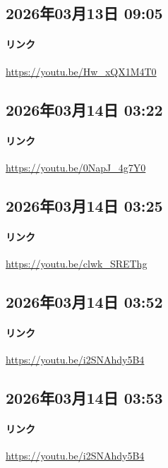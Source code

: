 \subsection*{2026年03月13日 09:05}

\paragraph{リンク}
\url{https://youtu.be/Hw_xQX1M4T0}

\subsection*{2026年03月14日 03:22}

\paragraph{リンク}
\url{https://youtu.be/0NapJ_4g7Y0}

\subsection*{2026年03月14日 03:25}

\paragraph{リンク}
\url{https://youtu.be/clwk_SREThg}

\subsection*{2026年03月14日 03:52}

\paragraph{リンク}
\url{https://youtu.be/i2SNAhdy5B4}

\subsection*{2026年03月14日 03:53}

\paragraph{リンク}
\url{https://youtu.be/i2SNAhdy5B4}

